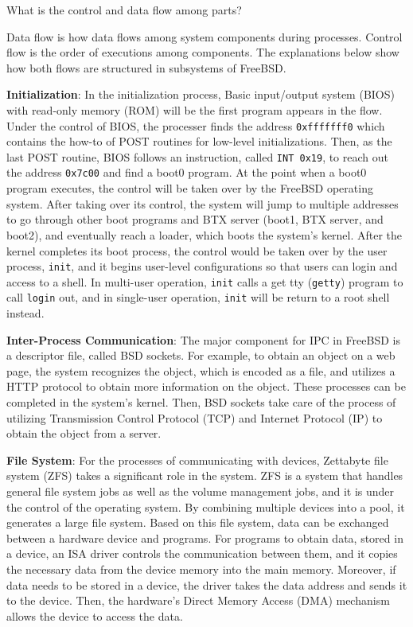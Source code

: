 \documentclass[12pt, dvipsnames, a4paper]{article}
\newcommand{\code}[1]{\texttt{#1}}
\begin{document}
What is the control and data flow among parts?\par
Data flow is how data flows among system components during processes. Control flow is the order of executions among components. The explanations below show how both flows are structured in subsystems of FreeBSD.\par
\textbf{Initialization}: In the initialization process, Basic input/output system (BIOS) with read-only memory (ROM) will be the first program appears in the flow. Under the control of BIOS, the processer finds the address \code{0xfffffff0} which contains the how-to of POST routines for low-level initializations. Then, as the last POST routine, BIOS follows an instruction, called \code{INT 0x19}, to reach out the address \code{0x7c00} and find a boot0 program. At the point when a boot0 program executes, the control will be taken over by the FreeBSD operating system. After taking over its control, the system will jump to multiple addresses to go through other boot programs and BTX server (boot1, BTX server, and boot2), and eventually reach a loader, which boots the system’s kernel. After the kernel completes its boot process, the control would be taken over by the user process, \code{init}, and it begins user-level configurations so that users can login and access to a shell. In multi-user operation, \code{init} calls a get tty (\code{getty}) program to call \code{login} out, and in single-user operation, \code{init} will be return to a root shell instead.\par
\textbf{Inter-Process Communication}: The major component for IPC in FreeBSD is a descriptor file, called BSD sockets. For example, to obtain an object on a web page, the system recognizes the object, which is encoded as a file, and utilizes a HTTP protocol to obtain more information on the object. These processes can be completed in the system’s kernel. Then, BSD sockets take care of the process of utilizing Transmission Control Protocol (TCP) and Internet Protocol (IP) to obtain the object from a server.\par
\textbf{File System}: For the processes of communicating with devices, Zettabyte file system (ZFS) takes a significant role in the system. ZFS is a system that handles general file system jobs as well as the volume management jobs, and it is under the control of the operating system. By combining multiple devices into a pool, it generates a large file system. Based on this file system, data can be exchanged between a hardware device and programs. For programs to obtain data, stored in a device, an ISA driver controls the communication between them, and it copies the necessary data from the device memory into the main memory. Moreover, if data needs to be stored in a device, the driver takes the data address and sends it to the device. Then, the hardware’s Direct Memory Access (DMA) mechanism allows the device to access the data.\par
\end{document}
